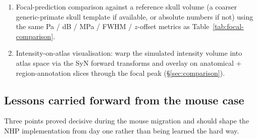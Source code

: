 \documentclass{compactarticle}
\begin{document}
\begin{enumerate}[leftmargin=*]
      calibration (free-field MI target $\to$ post-hoc $p_0$ rescaling)
      preserved unchanged.
\item Focal-prediction comparison against a reference skull volume
      (a coarser generic-primate skull template if available, or
      absolute numbers if not) using the same Pa / dB / MPa / FWHM /
      $z$-offset metrics as Table~\ref{tab:focal-comparison}.
\item Intensity-on-atlas visualisation: warp the simulated intensity
      volume into atlas space via the SyN forward transforms and
      overlay on anatomical + region-annotation slices through the
      focal peak (\S\ref{sec:comparison}).
\end{enumerate}

\subsection*{Lessons carried forward from the mouse case}

Three points proved decisive during the mouse migration and should
shape the NHP implementation from day one rather than being learned
the hard way.
\end{document}
